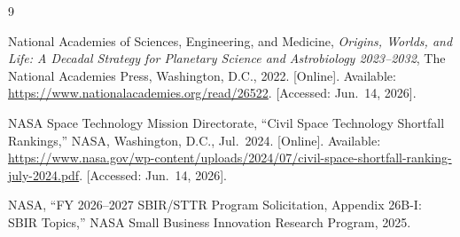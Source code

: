 \documentclass[11pt]{article}
\begin{document}
\begin{thebibliography}{9}

National Academies of Sciences, Engineering, and Medicine,
\textit{Origins, Worlds, and Life: A Decadal Strategy for Planetary Science and Astrobiology 2023--2032},
The National Academies Press, Washington, D.C., 2022.
[Online]. Available: \url{https://www.nationalacademies.org/read/26522}.
[Accessed: Jun.\ 14, 2026].

NASA Space Technology Mission Directorate,
``Civil Space Technology Shortfall Rankings,''
NASA, Washington, D.C., Jul.\ 2024.
[Online]. Available: \url{https://www.nasa.gov/wp-content/uploads/2024/07/civil-space-shortfall-ranking-july-2024.pdf}.
[Accessed: Jun.\ 14, 2026].

NASA,
``FY 2026--2027 SBIR/STTR Program Solicitation, Appendix 26B-I: SBIR Topics,''
NASA Small Business Innovation Research Program, 2025.

\end{thebibliography}
\end{document}
